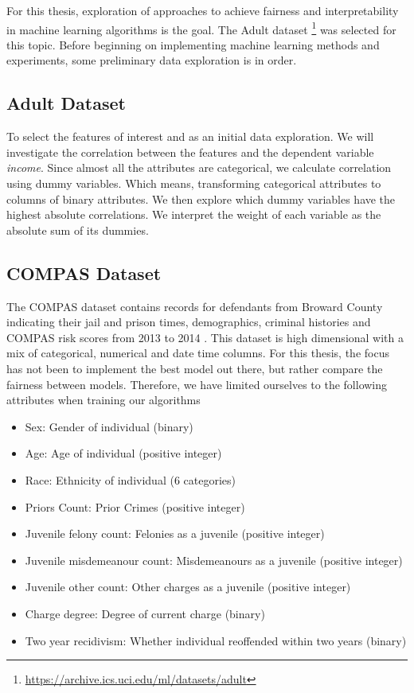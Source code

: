 For this thesis, exploration of approaches to achieve fairness and interpretability in machine learning algorithms is the goal. The Adult dataset \footnote{\url{https://archive.ics.uci.edu/ml/datasets/adult}} was selected for this topic. Before beginning on implementing machine learning methods and experiments, some preliminary data exploration is in order.

\subsection{Adult Dataset}

To select the features of interest and as an initial data exploration. We will investigate the correlation between the features and the dependent variable \emph{income}. Since almost all the attributes are categorical, we calculate correlation using dummy variables. Which means, transforming categorical attributes to columns of binary attributes. We then explore which dummy variables have the highest absolute correlations. We interpret the weight of each variable as the absolute sum of its dummies. 

\subsection{COMPAS Dataset}
The COMPAS dataset contains records for defendants from Broward County indicating their jail and prison times, demographics, criminal histories and COMPAS risk scores from 2013 to 2014 \cite{Mehrabi:2021:CSUR}. This dataset is high dimensional with a mix of categorical, numerical and date time columns. For this thesis, the focus has not been to implement the best model out there, but rather compare the fairness between models. Therefore, we have limited ourselves to the following attributes when training our algorithms

\begin{itemize}
    \item Sex: Gender of individual (binary)
    \item Age: Age of individual (positive integer)
    \item Race: Ethnicity of individual (6 categories)
    \item Priors Count: Prior Crimes (positive integer)
    \item Juvenile felony count: Felonies as a juvenile (positive integer)
    \item Juvenile misdemeanour count: Misdemeanours as a juvenile (positive integer)
    \item Juvenile other count: Other charges as a juvenile (positive integer)
    \item Charge degree: Degree of current charge (binary)
    \item Two year recidivism: Whether individual reoffended within two years (binary)
\end{itemize}

